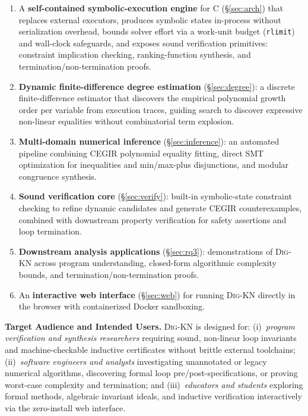 \documentclass[runningheads]{llncs}
\newcommand{\tool}{\textsc{Dig-KN}\xspace}
\newcommand{\code}[1]{\texttt{\small #1}}
\begin{document}
\begin{enumerate}[leftmargin=1.5em,itemsep=2pt]
\item A \textbf{self-contained symbolic-execution engine} for C (\S\ref{sec:arch}) that replaces external executors, produces symbolic states in-process without serialization overhead, bounds solver effort via a work-unit budget (\code{rlimit}) and wall-clock safeguards, and exposes sound verification primitives: constraint implication checking, ranking-function synthesis, and termination/non-termination proofs.
\item \textbf{Dynamic finite-difference degree estimation} (\S\ref{sec:degree}): a discrete finite-difference estimator that discovers the empirical polynomial growth order per variable from execution traces, guiding search to discover expressive non-linear equalities without combinatorial term explosion.
\item \textbf{Multi-domain numerical inference} (\S\ref{sec:inference}): an automated pipeline combining CEGIR polynomial equality fitting, direct SMT optimization for inequalities and min/max-plus disjunctions, and modular congruence synthesis.
\item \textbf{Sound verification core} (\S\ref{sec:verify}): built-in symbolic-state constraint checking to refine dynamic candidates and generate CEGIR counterexamples, combined with downstream property verification for safety assertions and loop termination.
\item \textbf{Downstream analysis applications} (\S\ref{sec:rq3}): demonstrations of \tool{} across program understanding, closed-form algorithmic complexity bounds, and termination/non-termination proofs.
\item An \textbf{interactive web interface} (\S\ref{sec:web}) for running \tool{} directly in the browser with containerized Docker sandboxing.
\end{enumerate}

\medskip\noindent\textbf{Target Audience and Intended Users.}
\tool{} is designed for: (i)~\emph{program verification and synthesis researchers} requiring sound, non-linear loop invariants and machine-checkable inductive certificates without brittle external toolchains; (ii)~\emph{software engineers and analysts} investigating unannotated or legacy numerical algorithms, discovering formal loop pre/post-specifications, or proving worst-case complexity and termination; and (iii)~\emph{educators and students} exploring formal methods, algebraic invariant ideals, and inductive verification interactively via the zero-install web interface.
\end{document}
